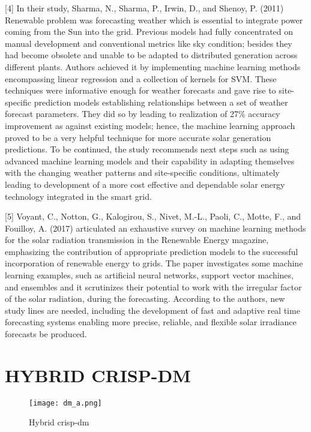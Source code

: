 \documentclass[conference]{IEEEtran}
\begin{document}
[4] In their study, Sharma, N., Sharma, P., Irwin, D., and Shenoy, P. (2011) Renewable problem was forecasting weather which is essential to integrate power coming from the Sun into the grid. Previous models had fully concentrated on manual development and conventional metrics like sky condition; besides they had become obsolete and unable to be adapted to distributed generation across different plants. Authors achieved it by implementing machine learning methods encompassing linear regression and a collection of kernels for SVM. These techniques were informative enough for weather forecasts and gave rise to site-specific prediction models establishing relationships between a set of weather forecast parameters. They did so by leading to realization of 27\% accuracy improvement as against existing models; hence, the machine learning approach proved to be a very helpful technique for more accurate solar generation predictions. To be continued, the study recommends next steps such as using advanced machine learning models and their capability in adapting themselves with the changing weather patterns and site-specific conditions, ultimately leading to development of a more cost effective and dependable solar energy technology integrated in the smart grid.

[5] Voyant, C., Notton, G., Kalogirou, S., Nivet, M.-L., Paoli, C., Motte, F., and Fouilloy, A. (2017) articulated an exhaustive survey on machine learning methods for the solar radiation transmission in the Renewable Energy magazine, emphasizing the contribution of appropriate prediction models to the successful incorporation of renewable energy to grids. The paper investigates some machine learning examples, such as artificial neural networks, support vector machines, and ensembles and it scrutinizes their potential to work with the irregular factor of the solar radiation, during the forecasting. According to the authors, new study lines are needed, including the development of fast and adaptive real time forecasting systems enabling more precise, reliable, and flexible solar irradiance forecasts be produced.

\section{HYBRID CRISP-DM}
\begin{figure}[H] %
    \centering
    \texttt{[image: dm\_a.png]}
    \caption{Hybrid crisp-dm}
    \label{fig:technical_workflow}
\end{figure}
\end{document}
